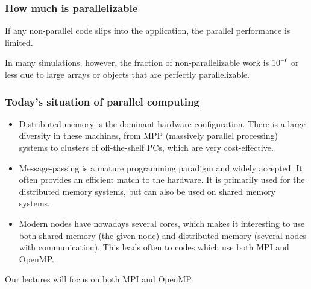 \documentclass{beamer}
\begin{document}
\begin{frame}
\frametitle{How much is parallelizable}

\begin{block}{}
If any non-parallel code slips into the
application, the parallel
performance is limited. 

In many simulations, however, the fraction of non-parallelizable work
is $10^{-6}$ or less due to large arrays or objects that are perfectly parallelizable.

\end{block}
\end{frame}

\begin{frame}
\frametitle{Today's situation of parallel computing}

\begin{block}{}

\begin{itemize}
\item Distributed memory is the dominant hardware configuration. There is a large diversity in these machines, from  MPP (massively parallel processing) systems to clusters of off-the-shelf PCs, which are very cost-effective.

\item Message-passing is a mature programming paradigm and widely accepted. It often provides an efficient match to the hardware. It is primarily used for the distributed memory systems, but can also be used on shared memory systems.

\item Modern nodes have nowadays several cores, which makes it interesting to use both shared memory (the given node) and distributed memory (several nodes with communication). This leads often to codes which use both MPI and OpenMP.
\end{itemize}

\noindent
Our lectures will focus on both MPI and OpenMP.

\end{block}
\end{frame}
\end{document}
